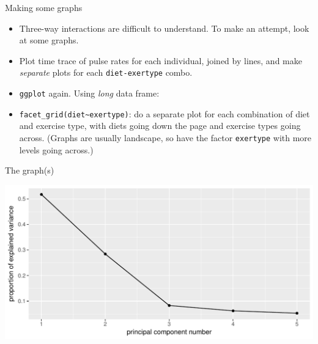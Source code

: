 \begin{frame}[fragile]{Making some graphs}
  
  \begin{itemize}
  \item Three-way  interactions are difficult to understand. To make
    an attempt, look at some graphs.
  \item Plot time trace of pulse rates for each individual, joined by
    lines, and make \emph{separate} plots for each
    \texttt{diet-exertype} combo.
  \item \texttt{ggplot} again. Using \emph{long} data frame:

\begin{knitrout}
\color{fgcolor}\begin{kframe}
\begin{alltt}
\hlkwb{=}\hlstd{(} \hlopt{+}
  \hlstd{()}\hlopt{+}\hlstd{()}\hlopt{+}\hlopt{~}
\end{alltt}
\end{kframe}
\end{knitrout}

\item \verb=facet_grid(diet~exertype)=: do a separate plot for each
  combination of diet and exercise type, with diets going down the
  page and exercise types going across. (Graphs are usually landscape,
  so have the factor \texttt{exertype} with more levels going across.)

\end{itemize}
  
\end{frame}

 
\begin{frame}[fragile]{The graph(s)}
  
\begin{knitrout}
\color{fgcolor}\begin{kframe}
\begin{alltt}
\end{alltt}
\end{kframe}
\includegraphics[width=\maxwidth]{figure/unnamed-chunk-18-1} 

\end{knitrout}
  
  
\end{frame}

